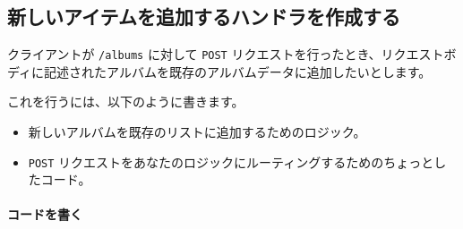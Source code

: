 


\subsection{新しいアイテムを追加するハンドラを作成する}

クライアントが \texttt{/albums} に対して \texttt{POST}
リクエストを行ったとき、リクエストボディに記述されたアルバムを既存のアルバムデータに追加したいとします。

これを行うには、以下のように書きます。

\begin{itemize}
\item
  新しいアルバムを既存のリストに追加するためのロジック。
\item
  \texttt{POST}
  リクエストをあなたのロジックにルーティングするためのちょっとしたコード。
\end{itemize}


\paragraph{コードを書く}

